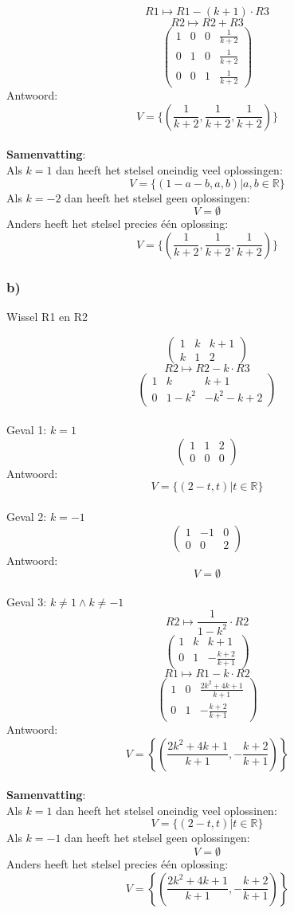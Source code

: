 \documentclass[lineaire_algebra_oplossingen.tex]{subfiles}
\begin{document}
\[ R1 \longmapsto R1 - (k+1)\cdot R3\]
\[ R2 \longmapsto R2 + R3\]
\[
\begin{pmatrix}
1 &  0 &  0 & \frac{1}{k+2}\\
0 &  1 &  0 & \frac{1}{k+2}\\
0 &  0 &  1 & \frac{1}{k+2}
\end{pmatrix}
\]
Antwoord:
\[
V=\{(\frac{1}{k+2},\frac{1}{k+2},\frac{1}{k+2})\}
\]\\
\textbf{Samenvatting}:\\
Als $k=1$ dan heeft het stelsel oneindig veel oplossingen:
\[
V=\{ (1-a-b,a,b) | a,b \in \mathbb{R}\}
\]
Als $k=-2$ dan heeft het stelsel geen oplossingen:
\[
V=\emptyset
\]
Anders heeft het stelsel precies één oplossing:
\[
V=\{(\frac{1}{k+2},\frac{1}{k+2},\frac{1}{k+2})\}
\]

\subsubsection*{b)}
\begin{center}
Wissel R1 en R2
\end{center}
\[
\begin{pmatrix}
1 &  k &  k+1\\
k &  1 &  2
\end{pmatrix}
\]
\[ R2 \longmapsto R2 - k\cdot R3\]
\[
\begin{pmatrix}
1 &  k &  k+1\\
0 &  1-k^2 &  -k^2-k+2
\end{pmatrix}
\]\\
Geval 1: $k=1$\\
\[
\begin{pmatrix}
1 &  1 &  2\\
0 &  0 &  0
\end{pmatrix}
\]
Antwoord:
\[
V=\{(2-t,t) | t \in \mathbb{R}\}
\]\\
Geval 2: $k=-1$\\
\[
\begin{pmatrix}
1 & -1 &  0\\
0 &  0 &  2
\end{pmatrix}
\]
Antwoord:
\[
V=\emptyset
\]\\
Geval 3: $k\neq 1 \wedge k\neq -1$\\
\[ R2 \longmapsto \frac{1}{1-k^2}\cdot R2 \]
\[
\begin{pmatrix}
1 &  k &  k+1\\
0 &  1 &  -\frac{k+2}{k+1}
\end{pmatrix}
\]
\[ R1 \longmapsto R1-k\cdot R2 \]
\[
\begin{pmatrix}
1 &  0 &  \frac{2k^2+4k+1}{k+1}\\
0 &  1 &  -\frac{k+2}{k+1}
\end{pmatrix}
\]
Antwoord:
\[
V=\left\lbrace\left(\frac{2k^2+4k+1}{k+1},-\frac{k+2}{k+1}\right)\right\rbrace
\]\\
\textbf{Samenvatting}:\\
Als $k=1$ dan heeft het stelsel oneindig veel oplossinen:
\[
V=\{(2-t,t) | t \in \mathbb{R}\}
\]
Als $k=-1$ dan heeft het stelsel geen oplossingen:
\[
V=\emptyset
\]
Anders heeft het stelsel precies één oplossing:
\[
V=\left\lbrace\left(\frac{2k^2+4k+1}{k+1},-\frac{k+2}{k+1}\right)\right\rbrace
\]
\end{document}
